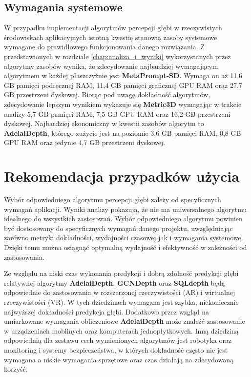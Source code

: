\subsection{Wymagania systemowe}
W przypadku implementacji algorytmów percepcji głębi w rzeczywistych środowiskach aplikacyjnych istotną kwestię stanowią zasoby systemowe wymagane do prawidłowego funkcjonowania danego rozwiązania. Z przedstawionych w rozdziale \ref{chap:analiza_i_wyniki} wykorzystanych przez algorytmy zasobów wynika, że zdecydowanie najbardziej wymagającym algorytmem w każdej płaszczyźnie jest \textbf{MetaPrompt-SD}. Wymaga on aż 11,6 GB pamięci podręcznej RAM, 11,4 GB pamięci graficznej GPU RAM oraz 27,7 GB przestrzeni dyskowej. Biorąc pod uwagę dokładność algorytmów, zdecydowanie lepszym wynikiem wykazuje się \textbf{Metric3D} wymagając w trakcie analizy 5,7 GB pamięci RAM, 7,5 GB GPU RAM oraz 16,2 GB przestrzeni dyskowej. Najbardziej ekonomiczny w kwestii zasobów algorytm to \textbf{AdelaiDepth}, którego zużycie jest na poziomie 3,6 GB pamięci RAM, 0,8 GB GPU RAM oraz jedynie 4,7 GB przestrzeni dyskowej.


\section{Rekomendacja przypadków użycia}
Wybór odpowiedniego algorytmu percepcji głębi zależy od specyficznych wymagań aplikacji. Wyniki analizy pokazują, że nie ma uniwersalnego algorytmu idealnego do wszystkich zastosowań. Wybór odpowiedniego algorytmu powinien być dostosowany do specyficznych wymagań danego projektu, uwzględniając zarówno metryki dokładności, wydajności czasowej jak i wymagania systemowe. Dzięki temu można osiągnąć optymalną wydajność i efektywność w zależności od zastosowania.

Ze względu na niski czas wykonania predykcji i dobrą zdolność predykcji głębi relatywnej algorytmy \textbf{AdelaiDepth}, \textbf{GCNDepth} oraz \textbf{SQLdepth} będą odpowiednie do zastosowania w rozszerzonej rzeczywistości (AR) i wirtualnej rzeczywistości (VR). W tych dziedzinach wymagana jest szybka, niekoniecznie najwyższej dokładności predykcja głębi. Dodatkowo przez wzgląd na umiarkowane wymagania obliczeniowe \textbf{AdelaiDepth} może znaleźć zastosowanie w urządzeniach moblinych oraz komputerach jednopłytkowych. Inną dziedziną odpowiednią dla zestawu cech wymienionych algorytmów jest robotyka oraz monitoring i systemy bezpieczeństwa, w których dokładność często nie jest wymagana a niskie wymagania sprzętowe oraz czas działają na zdecydowaną korzyść.

